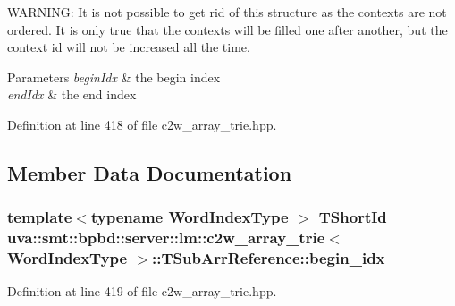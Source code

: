 W\+A\+R\+N\+I\+N\+G\+: It is not possible to get rid of this structure as the contexts are not ordered. It is only true that the contexts will be filled one after another, but the context id will not be increased all the time.


\begin{DoxyParams}{Parameters}
{\em begin\+Idx} & the begin index \\
\hline
{\em end\+Idx} & the end index \\
\hline
\end{DoxyParams}


Definition at line 418 of file c2w\+\_\+array\+\_\+trie.\+hpp.



\subsection{Member Data Documentation}
\hypertarget{structuva_1_1smt_1_1bpbd_1_1server_1_1lm_1_1c2w__array__trie_1_1_t_sub_arr_reference_ad095148797875c69535b2bf69269cb39}{}
\subsubsection[{begin\+\_\+idx}]{\setlength{\rightskip}{0pt plus 5cm}template$<$typename Word\+Index\+Type $>$ {\bf T\+Short\+Id} {\bf uva\+::smt\+::bpbd\+::server\+::lm\+::c2w\+\_\+array\+\_\+trie}$<$ {\bf Word\+Index\+Type} $>$\+::T\+Sub\+Arr\+Reference\+::begin\+\_\+idx}\label{structuva_1_1smt_1_1bpbd_1_1server_1_1lm_1_1c2w__array__trie_1_1_t_sub_arr_reference_ad095148797875c69535b2bf69269cb39}


Definition at line 419 of file c2w\+\_\+array\+\_\+trie.\+hpp.

\hypertarget{structuva_1_1smt_1_1bpbd_1_1server_1_1lm_1_1c2w__array__trie_1_1_t_sub_arr_reference_ab6f97bbea4b4fef4ba31b69127037f03}{}
